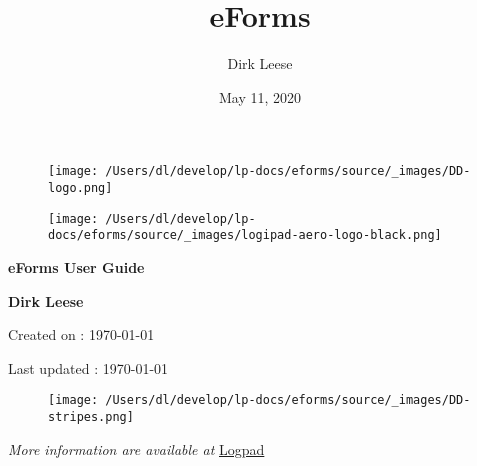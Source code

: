 \documentclass[a4paper,12pt,english]{sphinxmanual}
\title{eForms}
\date{May 11, 2020}
\author{Dirk Leese}
\begin{document}
\pagestyle{empty}


        \begin{titlepage}
            \centering
            \vspace*{0mm} %
            \begin{figure}[!h]
                \vspace*{-20mm}
                \texttt{[image: /Users/dl/develop/lp-docs/eforms/source/\_images/DD-logo.png]}
            \end{figure}
            \vspace{30mm} %
            \begin{figure}[!h]
                \centering
                \texttt{[image: /Users/dl/develop/lp-docs/eforms/source/\_images/logipad-aero-logo-black.png]}
            \end{figure}

            \vspace{10mm} 
            \textbf{\Huge {eForms User Guide}}

            \vspace{30mm}
            \Large \textbf{{Dirk Leese}}

            \small Created on : \today

            \vspace*{0mm}
            \small  Last updated : \MonthYearFormat\today
            
            \vspace{70mm}
            \begin{figure}[!h]
                \hspace*{-20mm}
                \texttt{[image: /Users/dl/develop/lp-docs/eforms/source/\_images/DD-stripes.png]}
            \end{figure}
            \vfill
            \small \textit{More information are available at }{\href{http://www.logipad.aero}{Logpad}}
        \end{titlepage}

        \clearpage
        \tableofcontents
        \listoffigures
        \listoftables
        \clearpage

        
\pagestyle{plain}
 
\end{document}

